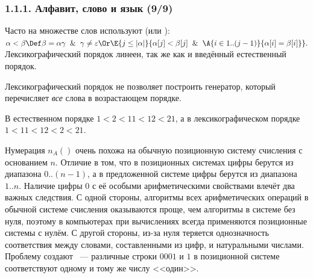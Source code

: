 \begin{frame}
\frametitle{1.1.1. Алфавит, слово и язык (9/9)}
Часто на множестве слов используют 
 (или ):\\
$\alpha<\beta\Def \beta=\alpha\gamma\And\gamma\neq\varepsilon 
\Or \E{j\le|\alpha|}{\alpha[j]<
\beta[j]\And\A{i \in 1..(j-1)}{\alpha[i]=
\beta[i]}}.$ 
Лексикогра\-фи\-ческий порядок линеен, так же как и введённый естественный порядок.  

\begin{remark}
Лексикографический порядок не позволяет построить генератор, который перечисляет
{\em все} слова в возрастающем порядке. 
\end{remark}

\begin{example}
В естественном порядке 
$ 1 < 2 <11 <12< 21 $, 
а в лексикографическом порядке 
$1<11<12<2<21$. 
\end{example}

\begin{digress}
Нумерация $n_A()$ очень похожа на 
обычную позиционную
систему счисления с основанием $n$. 
Отличие в том, что в позиционных системах
цифры берутся из диапазона $0..(n-1)$,
а в предложенной системе цифры берутся из
диапазона $1..n$. Наличие цифры $0$ с её 
особыми арифметическими свойствами влечёт два важных следствия. С одной стороны,
алгоритмы 
всех арифметических операций в обычной 
системе счисления
оказываются проще, чем алгоритмы 
в системе без нуля,
поэтому в компьютерах при вычислениях всегда применяются позиционные системы с нулём.
С другой стороны, из-за нуля
теряется однозначность соответствия
между словами, составленными из цифр, 
и натуральными числами. Проблему
создают ~---
различные строки $0001$ и $1$ в позиционной системе соответствуют одному и тому же
числу <<один>>.
\end{digress}

\end{frame}

